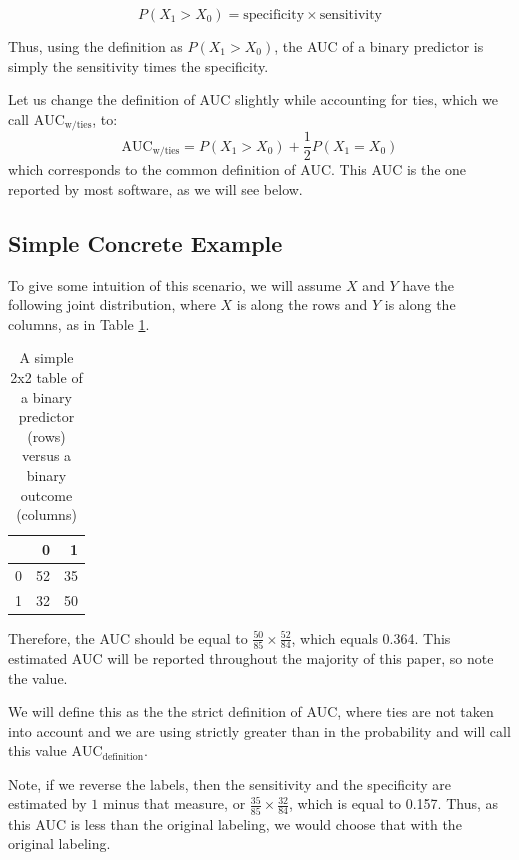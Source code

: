\documentclass[article]{jss}
\begin{document}
\[
P(X_{1} > X_{0}) = \text{specificity} \times \text{sensitivity}
\]

Thus, using the definition as \(P(X_{1} > X_{0})\), the AUC of a binary
predictor is simply the sensitivity times the specificity.

Let us change the definition of AUC slightly while accounting for ties,
which we call \(\text{AUC}_{\text{w/ties}}\), to: \[
\text{AUC}_{\text{w/ties}} = P(X_{1} > X_{0}) + \frac{1}{2} P(X_{1} = X_{0})
\] which corresponds to the common definition of AUC. This AUC is the
one reported by most software, as we will see below.

\hypertarget{simple-concrete-example}{%
\subsection{Simple Concrete Example}\label{simple-concrete-example}}

To give some intuition of this scenario, we will assume \(X\) and \(Y\)
have the following joint distribution, where \(X\) is along the rows and
\(Y\) is along the columns, as in Table \ref{tab:create_tab}.

\begin{CodeChunk}
\begin{table}[ht]

\caption{\label{tab:create_tab}A simple 2x2 table of a binary predictor (rows) versus a binary outcome (columns)}
\centering
\begin{tabular}{l|r|r}
\hline
  & 0 & 1\\
\hline
0 & 52 & 35\\
\hline
1 & 32 & 50\\
\hline
\end{tabular}
\end{table}

\end{CodeChunk}

Therefore, the AUC should be equal to
\(\frac{50}{85} \times \frac{52}{84}\), which equals 0.364. This
estimated AUC will be reported throughout the majority of this paper, so
note the value.

We will define this as the the strict definition of AUC, where ties are
not taken into account and we are using strictly greater than in the
probability and will call this value \(\text{AUC}_{\text{definition}}\).

Note, if we reverse the labels, then the sensitivity and the specificity
are estimated by \(1\) minus that measure, or
\(\frac{35}{85} \times \frac{32}{84}\), which is equal to 0.157. Thus,
as this AUC is less than the original labeling, we would choose that
with the original labeling.
\end{document}
